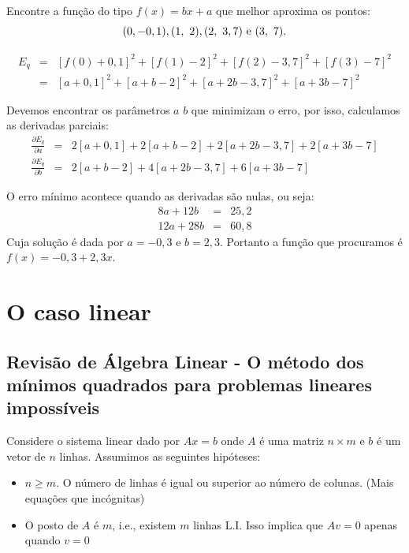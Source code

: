 \documentclass[main.tex]{subfiles}
\begin{document}
\begin{ex}Encontre a função do tipo $f(x)=bx+a$ que melhor aproxima os pontos:
  \begin{equation*}
    (0,-0,1), (1,~2), (2,~3,7) ~ \hbox{e} ~(3,~7).  
  \end{equation*}
\end{ex}
\begin{sol}
\begin{eqnarray*}
E_q&=&[f(0)+0,1]^2+[f(1)-2]^2+[f(2)-3,7]^2+[f(3)-7]^2\\
&=&[a+0,1]^2+[a+b-2]^2+[a+2b-3,7]^2+[a+3b-7]^2
\end{eqnarray*}

Devemos encontrar os parâmetros $a$ $b$ que minimizam o erro, por isso, calculamos as derivadas parciais:
\begin{eqnarray*}
\frac{\partial E_q}{\partial a}&=&2[a+0,1]+2[a+b-2]+2[a+2b-3,7]+2[a+3b-7]\\
\frac{\partial E_q}{\partial b}&=&2[a+b-2]+4[a+2b-3,7]+6[a+3b-7]
\end{eqnarray*}



O erro mínimo acontece quando as derivadas são nulas, ou seja:
\begin{eqnarray*}
8a+12b&=&25,2\\
12a+28b&=&60,8
\end{eqnarray*}
Cuja solução é dada por $a=-0,3$ e $b=2,3$.
Portanto a função que procuramos é $f(x)=-0,3 +2,3x$.  
\end{sol}



\section{O caso linear}

\subsection{Revisão de Álgebra Linear - O método dos mínimos quadrados para problemas lineares impossíveis}

Considere o sistema linear dado por
$Ax=b$
onde $A$ é uma matriz $n\times m$ e $b$ é um vetor de $n$ linhas. Assumimos as seguintes hipóteses:
\begin{itemize}
\item $n\geq m$. O número de linhas é igual ou superior ao número de colunas. (Mais equações que incógnitas)
\item O posto de $A$ é $m$, i.e., existem $m$ linhas L.I. Isso implica que $Av=0$ apenas quando $v=0$
\end{itemize}
\end{document}

